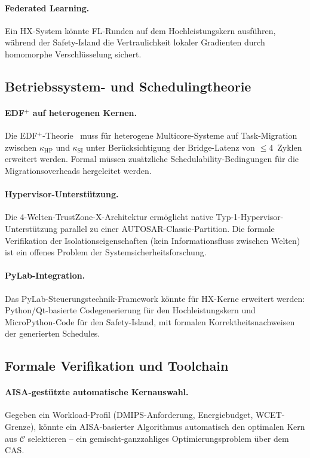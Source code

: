 ﻿\documentclass[a4paper,12pt]{article}
\theoremstyle{plain}
\theoremstyle{definition}
\theoremstyle{remark}
\begin{document}
\paragraph{Federated Learning.}
Ein HX-System k\"onnte FL-Runden auf dem Hochleistungskern ausf\"uhren,
w\"ahrend der Safety-Island die Vertraulichkeit lokaler Gradienten durch
homomorphe Verschl\"usselung sichert.

\subsection{Betriebssystem- und Schedulingtheorie}

\paragraph{EDF$^+$ auf heterogenen Kernen.}
Die EDF$^+$-Theorie~\cite{epp2026b} muss f\"ur heterogene Multicore-Systeme
auf Task-Migration zwischen $\kappa_\mathrm{HP}$ und $\kappa_\mathrm{SI}$
unter Ber\"ucksichtigung der Bridge-Latenz von $\leq4$~Zyklen erweitert werden.
Formal m\"ussen zus\"atzliche Schedulability-Bedingungen f\"ur die
Migrationsoverheads hergeleitet werden.

\paragraph{Hypervisor-Unterst\"utzung.}
Die 4-Welten-TrustZone-X-Architektur erm\"oglicht native Typ-1-Hypervisor-Unterst\"utzung
parallel zu einer AUTOSAR-Classic-Partition. Die formale Verifikation der
Isolationseigenschaften (kein Informationsfluss zwischen Welten) ist ein
offenes Problem der Systemsicherheitsforschung.

\paragraph{PyLab-Integration.}
Das PyLab-Steuerungstechnik-Framework k\"onnte f\"ur HX-Kerne erweitert werden:
Python/Qt-basierte Codegenerierung f\"ur den Hochleistungskern und
MicroPython-Code f\"ur den Safety-Island, mit formalen Korrektheitsnachweisen
der generierten Schedules.

\subsection{Formale Verifikation und Toolchain}

\paragraph{AISA-gest\"utzte automatische Kernauswahl.}
Gegeben ein Workload-Profil (DMIPS-Anforderung, Energiebudget, WCET-Grenze),
k\"onnte ein AISA-basierter Algorithmus automatisch den optimalen Kern aus
$\mathcal{C}$ selektieren -- ein gemischt-ganzzahliges Optimierungsproblem
\"uber dem CAS.
\end{document}
